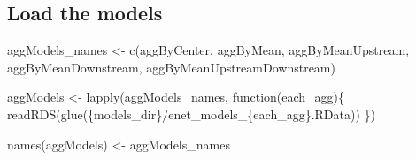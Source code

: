 \documentclass[
  letterpaper,
  DIV=11,
  numbers=noendperiod]{scrartcl}
\newenvironment{Shaded}{\begin{snugshade}}{\end{snugshade}}
\newcommand{\AttributeTok}[1]{\textcolor[rgb]{0.40,0.45,0.13}{#1}}
\newcommand{\ControlFlowTok}[1]{\textcolor[rgb]{0.00,0.23,0.31}{#1}}
\newcommand{\FunctionTok}[1]{\textcolor[rgb]{0.28,0.35,0.67}{#1}}
\newcommand{\NormalTok}[1]{\textcolor[rgb]{0.00,0.23,0.31}{#1}}
\newcommand{\OtherTok}[1]{\textcolor[rgb]{0.00,0.23,0.31}{#1}}
\newcommand{\SpecialCharTok}[1]{\textcolor[rgb]{0.37,0.37,0.37}{#1}}
\newcommand{\StringTok}[1]{\textcolor[rgb]{0.13,0.47,0.30}{#1}}
\begin{document}
\begin{Shaded}
\end{Shaded}

\hypertarget{load-the-models}{%
\subsection{Load the models}\label{load-the-models}}

\begin{Shaded}
\begin{Highlighting}[numbers=left,,]
\NormalTok{aggModels\_names }\OtherTok{\textless{}{-}} \FunctionTok{c}\NormalTok{(}\StringTok{\textquotesingle{}aggByCenter\textquotesingle{}}\NormalTok{, }\StringTok{\textquotesingle{}aggByMean\textquotesingle{}}\NormalTok{, }\StringTok{\textquotesingle{}aggByMeanUpstream\textquotesingle{}}\NormalTok{, }\StringTok{\textquotesingle{}aggByMeanDownstream\textquotesingle{}}\NormalTok{, }\StringTok{\textquotesingle{}aggByMeanUpstreamDownstream\textquotesingle{}}\NormalTok{)}

\NormalTok{aggModels }\OtherTok{\textless{}{-}} \FunctionTok{lapply}\NormalTok{(aggModels\_names, }\ControlFlowTok{function}\NormalTok{(each\_agg)\{}
    \FunctionTok{readRDS}\NormalTok{(}\FunctionTok{glue}\NormalTok{(}\StringTok{\textquotesingle{}\{models\_dir\}/enet\_models\_\{each\_agg\}.RData\textquotesingle{}}\NormalTok{))}
\NormalTok{\})}

\FunctionTok{names}\NormalTok{(aggModels) }\OtherTok{\textless{}{-}}\NormalTok{ aggModels\_names}
\end{Highlighting}
\end{Shaded}
\end{document}
